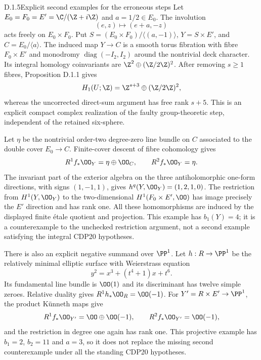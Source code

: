 \begin{idstatement}{D.1.5}{Explicit second examples for the erroneous steps}
\label{st:D.1.5}
Let $E_0=F_0=E'=\C/(\Z+i\Z)$ and $a=1/2\in E_0$.
The involution
\[
(e,z)\longmapsto(e+a,-z)
\]
acts freely on $E_0\times F_0$. Put
$S=(E_0\times F_0)/\langle(a,-1)\rangle$,
$Y=S\times E'$, and $C=E_0/\langle a\rangle$.
The induced map $Y\to C$ is a smooth torus fibration with fibre
$F_0\times E'$ and monodromy
$\operatorname{diag}(-I_2,I_2)$ around the nontrivial deck character.
Its integral homology coinvariants are
$\Z^2\oplus(\Z/2\Z)^2$. After removing $s\geq1$ fibres,
Proposition D.1.1 gives
\[
H_1(U;\Z)=\Z^{s+3}\oplus(\Z/2\Z)^2,
\]
whereas the uncorrected direct-sum argument has free rank $s+5$.
This is an explicit compact complex realization of the faulty
group-theoretic step, independent of the retained six-sphere.

Let $\eta$ be the nontrivial order-two degree-zero line bundle on
$C$ associated to the double cover $E_0\to C$. Finite-cover descent
of fibre cohomology gives
\[
R^1f_*\OO_Y=\eta\oplus\OO_C,\qquad R^2f_*\OO_Y=\eta.
\]
The invariant part of the exterior algebra on the three
antiholomorphic one-form directions, with signs $(1,-1,1)$,
gives $h^q(Y,\OO_Y)=(1,2,1,0)$. The restriction from
$H^1(Y,\OO_Y)$ to the two-dimensional $H^1(F_0\times E',\OO)$
has image precisely the $E'$ direction and has rank one.
All these homomorphisms are induced by the displayed finite
\'etale quotient and projection. This example has $b_1(Y)=4$;
it is a counterexample to the unchecked restriction argument, not
a second example satisfying the integral CDP20 hypotheses.

There is also an explicit negative summand over $\PP^1$. Let
$h:R\to\PP^1$ be the relatively minimal elliptic surface with
Weierstrass equation
\[
y^2=x^3+(t^4+1)x+t^6.
\]
Its fundamental line bundle is $\OO(1)$ and its discriminant has
twelve simple zeroes. Relative duality gives
$R^1h_*\OO_R=\OO(-1)$. For $Y'=R\times E'\to\PP^1$,
the product K\"unneth maps give
\[
R^1f_*\OO_{Y'}=\OO\oplus\OO(-1),\qquad
R^2f_*\OO_{Y'}=\OO(-1),
\]
and the restriction in degree one again has rank one. This
projective example has $b_1=2$, $b_2=11$ and $a=3$, so it does not
replace the missing second counterexample under all the standing
CDP20 hypotheses.
\end{idstatement}



